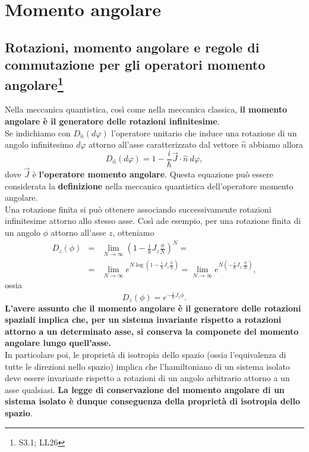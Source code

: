 \chapter{Momento angolare}
\section[Rotazioni, momento angolare e regole di commutazione]{Rotazioni, momento angolare e regole di commutazione per gli operatori momento angolare\footnote{S3.1; LL26}}
Nella meccanica quantistica, così come nella meccanica classica, \textbf{il momento angolare è il generatore delle rotazioni infinitesime}.\\
Se indichiamo con $D_{\widehat{n}} (d\varphi)$ l'operatore unitario che induce una rotazione di un angolo infinitesimo $d\varphi$ attorno all'asse caratterizzato dal vettore $\widehat{n}$ abbiamo allora
\begin{equation}
D_{\widehat{n}} (d\varphi)=1-\frac{i}{\hbar}\vec{J}\cdot \widehat{n}\ d\varphi ,
\end{equation}
dove $\vec{J}$ è \textbf{l'operatore momento angolare}. Questa equazione può essere considerata la \textbf{definizione} nella meccanica quantistica dell'operatore momento angolare.\\
Una rotazione finita si può ottenere associando successivamente rotazioni infinitesime attorno allo stesso asse. Così ade esempio, per una rotazione finita di un angolo $\phi$ attorno all'asse $z$, otteniamo
\begin{eqnarray}
D_z (\phi) &=& \lim _{N\rightarrow \infty} \left(1-\frac{i}{\hbar} J_z \frac{\phi}{N}\right) ^N= \nonumber \\
&=& \lim _{N\rightarrow \infty} e^{N\log\left(1-\frac{i}{\hbar} J_z \frac{\phi}{N}\right)}= \lim _{N\rightarrow \infty} e^{N\left(-\frac{i}{\hbar} J_z \ \frac{\phi}{N}\right)},
\end{eqnarray}
ossia
\begin{equation}
D_z (\phi)=e^{-\frac{i}{\hbar} J_z \phi}.
\end{equation}
\textbf{L'avere assunto che il momento angolare è il generatore delle rotazioni spaziali implica che, per un sistema invariante rispetto a rotazioni attorno a un determinato asse, si conserva la componete del momento angolare lungo quell'asse.}\\
In particolare poi, le proprietà di isotropia dello spazio (ossia l'equivalenza di tutte le direzioni nello spazio) implica che l'hamiltoniano di un sistema isolato deve essere invariante rispetto a rotazioni di un angolo arbitrario attorno a un asse qualsiasi. \textbf{La legge di conservazione del momento angolare di un sistema isolato è dunque conseguenza della proprietà di isotropia dello spazio}.\\

